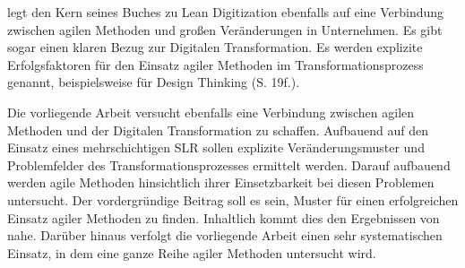  legt den Kern seines Buches zu Lean Digitization ebenfalls auf eine Verbindung zwischen agilen Methoden und großen Veränderungen in Unternehmen. Es gibt sogar einen klaren Bezug zur Digitalen Transformation. Es werden explizite Erfolgsfaktoren für den Einsatz agiler Methoden im Transformationsprozess genannt, beispielsweise für Design Thinking (S. 19f.). 

Die vorliegende Arbeit versucht ebenfalls eine Verbindung zwischen agilen Methoden und der Digitalen Transformation zu schaffen. Aufbauend auf den Einsatz eines mehrschichtigen SLR sollen explizite Veränderungsmuster und Problemfelder des Transformationsprozesses ermittelt werden. Darauf aufbauend werden agile Methoden hinsichtlich ihrer Einsetzbarkeit bei diesen Problemen untersucht. Der vordergründige Beitrag soll es sein, Muster für einen erfolgreichen Einsatz agiler Methoden zu finden. Inhaltlich kommt dies den Ergebnissen von  nahe. Darüber hinaus verfolgt die vorliegende Arbeit einen sehr systematischen Einsatz, in dem eine ganze Reihe agiler Methoden untersucht wird. 
